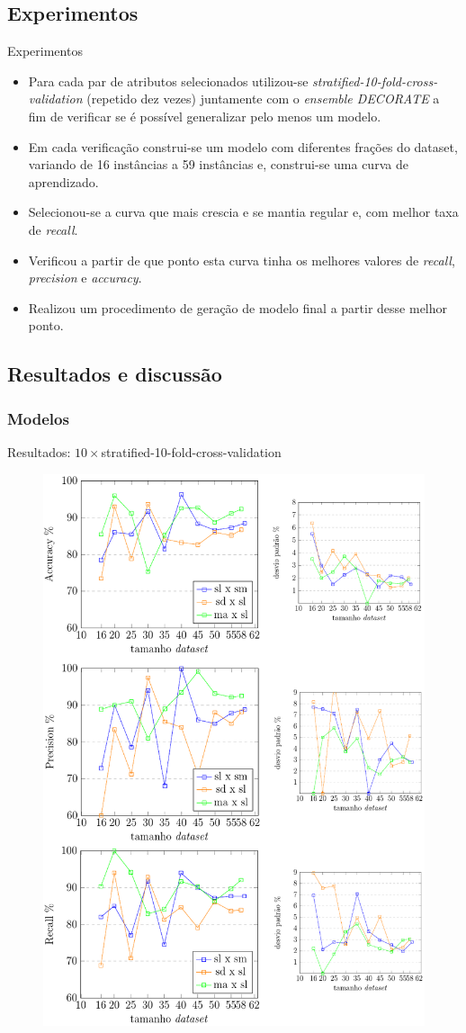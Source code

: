 \documentclass[brazil]{beamer}
\begin{document}
\subsection{Experimentos}
\begin{frame}{Experimentos}
   \begin{itemize}
      \item <1 ->Para cada par de atributos selecionados utilizou-se \textit{stratified-10-fold-cross-validation} (repetido dez vezes) juntamente com o \textit{ensemble DECORATE} a fim de verificar se é possível generalizar pelo menos um modelo.
      \item <2 ->Em cada verificação construi-se um modelo com diferentes frações do dataset, variando de 16 instâncias a 59 instâncias e, construi-se uma curva de aprendizado.
      \item <3 ->Selecionou-se a curva que mais crescia e se mantia regular e, com melhor taxa de \textit{recall}.
      \item <4 ->Verificou a partir de que ponto esta curva tinha os melhores valores de \textit{recall}, \textit{precision} e \textit{accuracy}.
      \item <5 ->Realizou um procedimento de geração de modelo final a partir desse melhor ponto.
   \end{itemize}
\end{frame}


\subsection{Resultados e discussão}
\subsubsection{Modelos}
\begin{frame}{Resultados: $10\times$stratified-10-fold-cross-validation}
\begin{figure}[!htb] \centering 
  \centering
  \includegraphics[width=0.5\columnwidth]{slide/accuracy_precision_recall} 
  \caption{} 
  \label{fig:accuracy_precision_recall}
\end{figure}
\end{frame}
\end{document}
